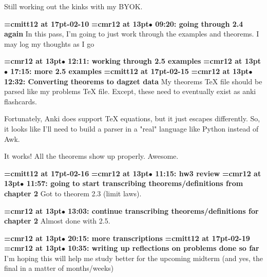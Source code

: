 Still working out the kinks with my BYOK.
\par

{\medskip\noindent\bf\font\titlefont=cmitt12 at 17pt-02-10}\medskip
{\smallskip\noindent\bf\font\titlefont=cmr12 at 13pt\titlefont $\bullet$ 09:20: going through 2.4 again}\smallskip
In this pass, I'm going to just work through the examples and theorems. I may log my thoughts as I go
\par

{\smallskip\noindent\bf\font\titlefont=cmr12 at 13pt\titlefont $\bullet$ 12:11: working through 2.5 examples}\smallskip
{\smallskip\noindent\bf\font\titlefont=cmr12 at 13pt\titlefont $\bullet$ 17:15: more 2.5 examples}\smallskip
{\medskip\noindent\bf\font\titlefont=cmitt12 at 17pt-02-15}\medskip
{\smallskip\noindent\bf\font\titlefont=cmr12 at 13pt\titlefont $\bullet$ 12:32: Converting theorems to dagzet data}\smallskip
My theorems TeX file should be parsed like my problems TeX file. Except, these need to eventually exist as anki flashcards.
\par

Fortunately, Anki does support TeX equations, but it just escapes differently. So, it looks like I'll need to build a parser in a "real" language like Python instead of Awk.
\par

It works! All the theorems show up properly. Awesome.
\par

{\medskip\noindent\bf\font\titlefont=cmitt12 at 17pt-02-16}\medskip
{\smallskip\noindent\bf\font\titlefont=cmr12 at 13pt\titlefont $\bullet$ 11:15: hw3 review}\smallskip
{\smallskip\noindent\bf\font\titlefont=cmr12 at 13pt\titlefont $\bullet$ 11:57: going to start transcribing theorems/definitions from chapter 2}\smallskip
Got to theorem 2.3 (limit laws).
\par

{\smallskip\noindent\bf\font\titlefont=cmr12 at 13pt\titlefont $\bullet$ 13:03: continue transcribing theorems/definitions for chapter 2}\smallskip
Almost done with 2.5.
\par

{\smallskip\noindent\bf\font\titlefont=cmr12 at 13pt\titlefont $\bullet$ 20:15: more transcriptions}\smallskip
{\medskip\noindent\bf\font\titlefont=cmitt12 at 17pt-02-19}\medskip
{\smallskip\noindent\bf\font\titlefont=cmr12 at 13pt\titlefont $\bullet$ 10:35: writing up reflections on problems done so far}\smallskip
I'm hoping this will help me study better for the upcoming midterm (and yes, the final in a matter of months/weeks)
\par

